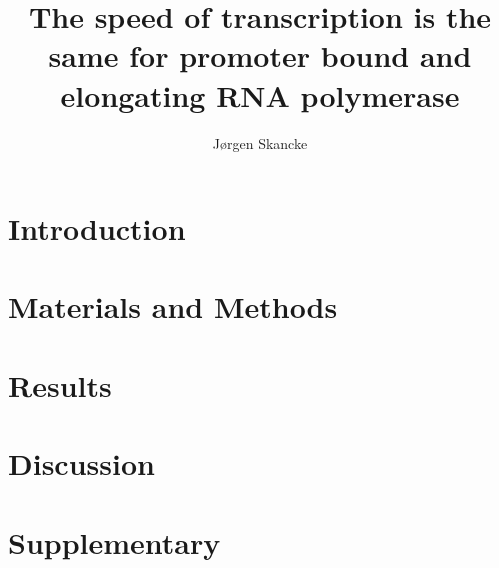 \documentclass[12pt]{article}
\author{J\o rgen Skancke}
\title{The speed of transcription is the same for promoter bound and
elongating RNA polymerase}
\begin{document}
\maketitle

\begin{abstract}

\end{abstract}

\section{Introduction}


\section{Materials and Methods}


\section{Results}


\section{Discussion}

\section{Supplementary}




\end{document}
